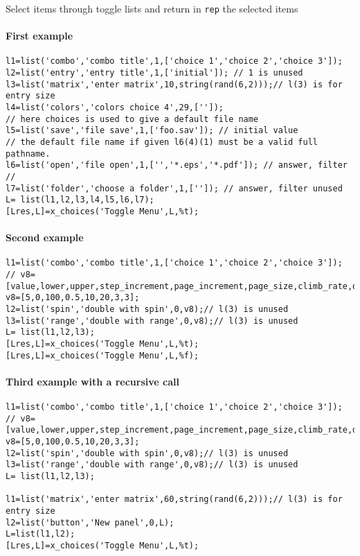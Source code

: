 \begin{mandescription}
  Select items through toggle lists and return in \verb!rep! the selected items
\end{mandescription}
\begin{examples}
\paragraph{First example}

\begin{Verbatim}
l1=list('combo','combo title',1,['choice 1','choice 2','choice 3']);
l2=list('entry','entry title',1,['initial']); // 1 is unused 
l3=list('matrix','enter matrix',10,string(rand(6,2)));// l(3) is for entry size
l4=list('colors','colors choice 4',29,['']);
// here choices is used to give a default file name 
l5=list('save','file save',1,['foo.sav']); // initial value 
// the default file name if given l6(4)(1) must be a valid full pathname.
l6=list('open','file open',1,['','*.eps','*.pdf']); // answer, filter 
// 
l7=list('folder','choose a folder',1,['']); // answer, filter unused 
L= list(l1,l2,l3,l4,l5,l6,l7);
[Lres,L]=x_choices('Toggle Menu',L,%t);
\end{Verbatim}

\paragraph{Second example}

\begin{Verbatim}
l1=list('combo','combo title',1,['choice 1','choice 2','choice 3']);
// v8=[value,lower,upper,step_increment,page_increment,page_size,climb_rate,digits] 
v8=[5,0,100,0.5,10,20,3,3];    
l2=list('spin','double with spin',0,v8);// l(3) is unused
l3=list('range','double with range',0,v8);// l(3) is unused
L= list(l1,l2,l3);
[Lres,L]=x_choices('Toggle Menu',L,%t);
[Lres,L]=x_choices('Toggle Menu',L,%f);
\end{Verbatim}

\paragraph{Third example with a recursive call}

\begin{Verbatim}
l1=list('combo','combo title',1,['choice 1','choice 2','choice 3']);
// v8=[value,lower,upper,step_increment,page_increment,page_size,climb_rate,digits] 
v8=[5,0,100,0.5,10,20,3,3];    
l2=list('spin','double with spin',0,v8);// l(3) is unused
l3=list('range','double with range',0,v8);// l(3) is unused
L= list(l1,l2,l3);
      
l1=list('matrix','enter matrix',60,string(rand(6,2)));// l(3) is for entry size
l2=list('button','New panel',0,L);
L=list(l1,l2);
[Lres,L]=x_choices('Toggle Menu',L,%t);
\end{Verbatim}
\end{examples}


